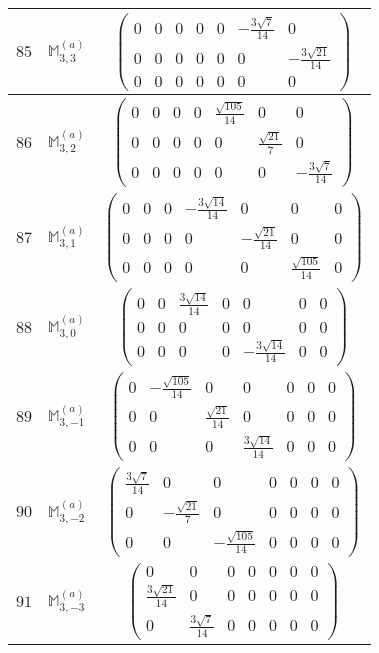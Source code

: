 \documentclass[fleqn,8pt,landscape]{jsarticle}
\begin{document}
\begin{center}
\begin{longtable}{ccc}
$ 85 $ & $ \mathbb{M}_{3,3}^{(a)} $ & $ \begin{pmatrix} 0 & 0 & 0 & 0 & 0 & - \frac{3 \sqrt{7}}{14} & 0 \\ 0 & 0 & 0 & 0 & 0 & 0 & - \frac{3 \sqrt{21}}{14} \\ 0 & 0 & 0 & 0 & 0 & 0 & 0 \end{pmatrix} $ \\ \hline
$ 86 $ & $ \mathbb{M}_{3,2}^{(a)} $ & $ \begin{pmatrix} 0 & 0 & 0 & 0 & \frac{\sqrt{105}}{14} & 0 & 0 \\ 0 & 0 & 0 & 0 & 0 & \frac{\sqrt{21}}{7} & 0 \\ 0 & 0 & 0 & 0 & 0 & 0 & - \frac{3 \sqrt{7}}{14} \end{pmatrix} $ \\ \hline
$ 87 $ & $ \mathbb{M}_{3,1}^{(a)} $ & $ \begin{pmatrix} 0 & 0 & 0 & - \frac{3 \sqrt{14}}{14} & 0 & 0 & 0 \\ 0 & 0 & 0 & 0 & - \frac{\sqrt{21}}{14} & 0 & 0 \\ 0 & 0 & 0 & 0 & 0 & \frac{\sqrt{105}}{14} & 0 \end{pmatrix} $ \\ \hline
$ 88 $ & $ \mathbb{M}_{3,0}^{(a)} $ & $ \begin{pmatrix} 0 & 0 & \frac{3 \sqrt{14}}{14} & 0 & 0 & 0 & 0 \\ 0 & 0 & 0 & 0 & 0 & 0 & 0 \\ 0 & 0 & 0 & 0 & - \frac{3 \sqrt{14}}{14} & 0 & 0 \end{pmatrix} $ \\ \hline
$ 89 $ & $ \mathbb{M}_{3,-1}^{(a)} $ & $ \begin{pmatrix} 0 & - \frac{\sqrt{105}}{14} & 0 & 0 & 0 & 0 & 0 \\ 0 & 0 & \frac{\sqrt{21}}{14} & 0 & 0 & 0 & 0 \\ 0 & 0 & 0 & \frac{3 \sqrt{14}}{14} & 0 & 0 & 0 \end{pmatrix} $ \\ \hline
$ 90 $ & $ \mathbb{M}_{3,-2}^{(a)} $ & $ \begin{pmatrix} \frac{3 \sqrt{7}}{14} & 0 & 0 & 0 & 0 & 0 & 0 \\ 0 & - \frac{\sqrt{21}}{7} & 0 & 0 & 0 & 0 & 0 \\ 0 & 0 & - \frac{\sqrt{105}}{14} & 0 & 0 & 0 & 0 \end{pmatrix} $ \\ \hline
$ 91 $ & $ \mathbb{M}_{3,-3}^{(a)} $ & $ \begin{pmatrix} 0 & 0 & 0 & 0 & 0 & 0 & 0 \\ \frac{3 \sqrt{21}}{14} & 0 & 0 & 0 & 0 & 0 & 0 \\ 0 & \frac{3 \sqrt{7}}{14} & 0 & 0 & 0 & 0 & 0 \end{pmatrix} $ \\ \hline

\end{longtable}
\end{center}
\end{document}
